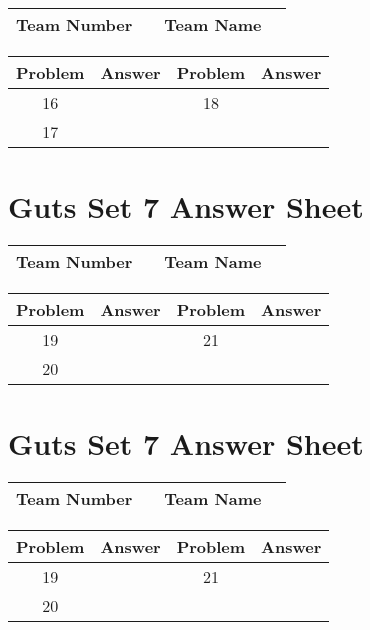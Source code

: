 \documentclass[14pt]{article}
\begin{document}
\begin{center}
\begin{tabular}{|r|r|r|r|}
\hline
	Team Number & \hspace{10em} &
	Team Name & \hspace{15em} \\ \hline
\end{tabular}
\end{center}
\begin{tabularx}{\textwidth}{|c|l|c|X|}\hline
	Problem & Answer & Problem & Answer \\\hline
	16 & \hspace{15em} & 18 & \\\hline
	17 & & & \\\hline
\end{tabularx}

\section*{Guts Set 7 Answer Sheet}

\begin{center}
\begin{tabular}{|r|r|r|r|}
\hline
	Team Number & \hspace{10em} &
	Team Name & \hspace{15em} \\ \hline
\end{tabular}
\end{center}
\begin{tabularx}{\textwidth}{|c|l|c|X|}\hline
	Problem & Answer & Problem & Answer \\\hline
	19 & \hspace{15em} & 21 & \\\hline
	20 & & & \\\hline
\end{tabularx}

\vspace{30px}

\section*{Guts Set 7 Answer Sheet}

\begin{center}
\begin{tabular}{|r|r|r|r|}
\hline
	Team Number & \hspace{10em} &
	Team Name & \hspace{15em} \\ \hline
\end{tabular}
\end{center}
\begin{tabularx}{\textwidth}{|c|l|c|X|}\hline
	Problem & Answer & Problem & Answer \\\hline
	19 & \hspace{15em} & 21 & \\\hline
	20 & & & \\\hline
\end{tabularx}
\end{document}
